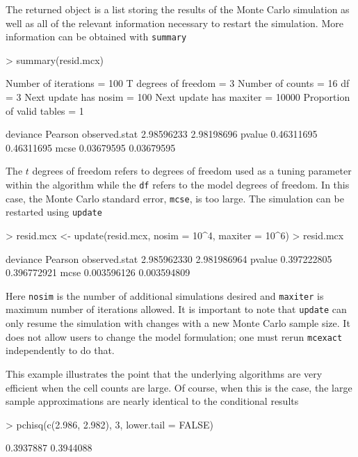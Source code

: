 \documentclass[a4paper]{article}
\newcommand{\mcexact}{\texttt{mcexact} }
\begin{document}
The returned object is a list storing the results of the Monte Carlo
simulation as well as all of the relevant information necessary to
restart the simulation.  More information can be obtained with
\texttt{summary}
\begin{Schunk}
\begin{Sinput}
> summary(resid.mcx)
\end{Sinput}
\begin{Soutput}
Number of iterations       =  100 
T degrees of freedom       =  3 
Number of counts           =  16 
df                         =  3 
Next update has nosim      =  100 
Next update has maxiter    =  10000 
Proportion of valid tables =  1 

                deviance    Pearson
observed.stat 2.98596233 2.98198696
pvalue        0.46311695 0.46311695
mcse          0.03679595 0.03679595
\end{Soutput}
\end{Schunk}
The $t$ degrees of freedom refers to degrees of freedom used as a
tuning parameter within the algorithm while the \texttt{df} refers to
the model degrees of freedom. In this case, the Monte Carlo standard
error, \texttt{mcse}, is too large. The simulation can be restarted
using \texttt{update}
\begin{Schunk}
\begin{Sinput}
> resid.mcx <- update(resid.mcx, nosim = 10^4, maxiter = 10^6)
> resid.mcx
\end{Sinput}
\begin{Soutput}
                 deviance     Pearson
observed.stat 2.985962330 2.981986964
pvalue        0.397222805 0.396772921
mcse          0.003596126 0.003594809
\end{Soutput}
\end{Schunk}
Here \texttt{nosim} is the number of additional simulations desired
and \texttt{maxiter} is maximum number of iterations allowed.  It is
important to note that \texttt{update} can only resume the simulation
with changes with a new Monte Carlo sample size. It does not allow
users to change the model formulation; one must rerun \mcexact
independently to do that.

This example illustrates the point that the underlying algorithms are
very efficient when the cell counts are large. Of course, when this is
the case, the large sample approximations are nearly identical to the
conditional results
\begin{Schunk}
\begin{Sinput}
> pchisq(c(2.986, 2.982), 3, lower.tail = FALSE)
\end{Sinput}
\begin{Soutput}
[1] 0.3937887 0.3944088
\end{Soutput}
\end{Schunk}
\end{document}
